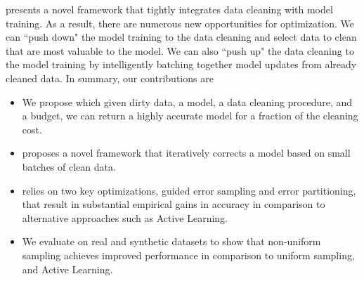 \sys presents a novel framework that tightly integrates data cleaning with model training.
As a result, there are numerous new opportunities for optimization.
We can ``push down" the model training to the data cleaning and select data to clean that are most valuable to the model.
We can also ``push up" the data cleaning to the model training by intelligently batching together model updates from already cleaned data.
In summary, our contributions are
\begin{itemize}[noitemsep]
\item We propose \sysfull which given dirty data, a model, a data cleaning procedure, and a budget, we can return a highly accurate model for a fraction of the cleaning cost.
\item \sys proposes a novel framework that iteratively corrects a model based on small batches of clean data.
\item \sys relies on two key optimizations, guided error sampling and error partitioning, that result in substantial empirical gains in accuracy in comparison to alternative approaches such as Active Learning.
\item We evaluate \sysfull on real and synthetic datasets to show that non-uniform sampling achieves improved performance in comparison to uniform sampling, and Active Learning.
\end{itemize}








